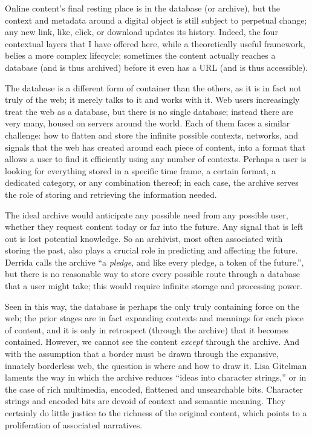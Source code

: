 Online content's final resting place is in the database (or archive), but the context and metadata around a digital object is still subject to perpetual change; any new link, like, click, or download updates its history. Indeed, the four contextual layers that I have offered here, while a theoretically useful framework, belies a more complex lifecycle; sometimes the content actually reaches a database (and is thus archived) before it even has a URL (and is thus accessible).

The database is a different form of container than the others, as it is in fact not truly of the web; it merely talks to it and works with it. Web users increasingly treat the web as a database, but there is no single database; instead there are very many, housed on servers around the world. Each of them faces a similar challenge: how to flatten and store the infinite possible contexts, networks, and signals that the web has created around each piece of content, into a format that allows a user to find it efficiently using any number of contexts. Perhaps a user is looking for everything stored in a specific time frame, a certain format, a dedicated category, or any combination thereof; in each case, the archive serves the role of storing and retrieving the information needed.

The ideal archive would anticipate any possible need from any possible user, whether they request content today or far into the future. Any signal that is left out is lost potential knowledge. So an archivist, most often associated with storing the past, also plays a crucial role in predicting and affecting the future. Derrida calls the archive ``a \emph{pledge}, and like every pledge, a token of the future.''\autocite[18]{derrida_archive_1995}, but there is no reasonable way to store every possible route through a database that a user might take; this would require infinite storage and processing power.

Seen in this way, the database is perhaps the only truly containing force on the web; the prior stages are in fact expanding contexts and meanings for each piece of content, and it is only in retrospect (through the archive) that it becomes contained. However, we cannot see the content \emph{except} through the archive. And with the assumption that a border must be drawn through the expansive, innately borderless web, the question is where and how to draw it. Lisa Gitelman laments the way in which the archive reduces ``ideas into character strings,'' or in the case of rich multimedia, encoded, flattened and unsearchable bits.\autocite{gitelman_response_2013} Character strings and encoded bits are devoid of context and semantic meaning. They certainly do little justice to the richness of the original content, which points to a proliferation of associated narratives.


